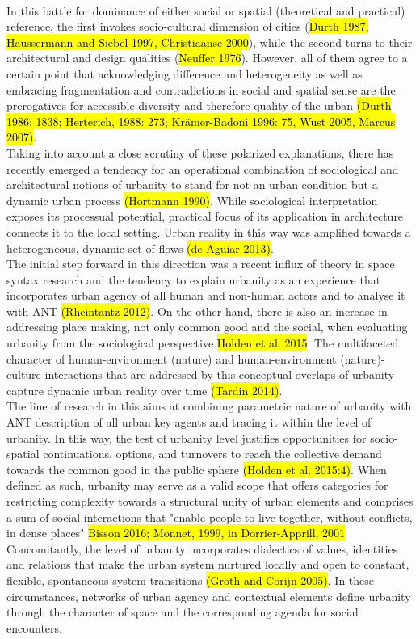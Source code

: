 \documentclass[11pt]{report}
\begin{document}
\\
In this battle for dominance of either social or spatial (theoretical and practical) reference, the first invokes socio-cultural dimension of cities (\hl{Durth 1987, Haussermann and Siebel 1997, Christiaanse 2000}), while the second turns to their architectural and design qualities (\hl{Neuffer 1976}).
However, all of them agree to a certain point that acknowledging difference and heterogeneity as well as embracing fragmentation and contradictions in social and spatial sense are the prerogatives for accessible diversity and therefore quality of the urban \hl{(Durth 1986: 1838; Herterich, 1988: 273; Krämer-Badoni 1996: 75, Wust 2005, Marcus 2007)}. 
\\
Taking into account a close scrutiny of these polarized explanations, there has recently emerged a tendency for an operational combination of sociological and architectural notions of urbanity to stand for not an urban condition but a dynamic urban process \hl{(Hortmann 1990)}.
While sociological interpretation exposes its processual potential, practical focus of its application in architecture connects it to the local setting.
Urban reality in this way was amplified towards a heterogeneous, dynamic set of flows \hl{(de Aguiar 2013)}.
\\
The initial step forward in this direction was a recent influx of theory in space syntax research and the tendency to explain urbanity as an experience that incorporates urban agency of all human and non-human actors and to analyse it with ANT \hl{(Rheintantz 2012)}.
On the other hand, there is also an increase in addressing place making, not only common good and the social, when evaluating urbanity from the sociological perspective \hl{Holden et al. 2015}. 
The multifaceted character of human-environment (nature) and human-environment (nature)-culture interactions that are addressed by this conceptual overlaps of urbanity capture dynamic urban reality over time \hl{(Tardin 2014)}.
\\
The line of research in this aims at combining parametric nature of urbanity with ANT description of all urban key agents and tracing it within the level of urbanity. In this way, the test of urbanity level justifies opportunities for socio-spatial continuations, options, and turnovers to reach the collective demand towards the common good in the public sphere \hl{(Holden et al. 2015:4)}. 
When defined as such, urbanity may serve as a valid scope that offers categories for restricting complexity towards a structural unity of urban elements and comprises a sum of social interactions that "enable people  to  live  together,  without  conflicts,  in  dense places"
\hl{Bisson 2016; Monnet, 1999, in Dorrier-Apprill, 2001}
Concomitantly, the level of urbanity incorporates dialectics of values, identities and relations that make the urban system nurtured locally and open to constant, flexible, spontaneous system transitions \hl{(Groth and Corijn 2005)}.
In these circumstances, networks of urban agency and contextual elements define urbanity through the character of space and the corresponding agenda for social encounters.
\end{document}
